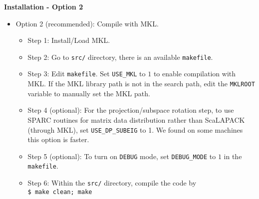 \begin{frame}{\textbf{Installation - Option 2}} \label{Installation:2}

\begin{itemize}
\item Option 2 (recommended): Compile with MKL.
	\begin{itemize}
		\item Step 1: Install/Load MKL.
		\item Step 2: Go to \texttt{src/} directory, there is an available \texttt{makefile}.
		\item Step 3: Edit \texttt{makefile}. Set \texttt{USE\_MKL} to $1$ to enable compilation with MKL. If the MKL library path is not in the search path, edit the \texttt{MKLROOT} variable to manually set the MKL path.
		\item Step 4 (optional): For the projection/subspace rotation step, to use SPARC routines for matrix data distribution rather than ScaLAPACK (through MKL), set \texttt{USE\_DP\_SUBEIG} to 1. We found on some machines this option is faster.
		\item Step 5 (optional): To turn on \texttt{DEBUG} mode, set \texttt{DEBUG\_MODE} to $1$ in the \texttt{makefile}.
		\item Step 6: Within the \texttt{src/} directory, compile the code by \\
		      \texttt{\$ make clean; make}
	\end{itemize}
\end{itemize}

\end{frame}


